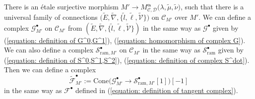\documentclass[pdftex]{sigma}
\numberwithin{equation}{section}
\newcommand{\balpha}{\boldsymbol \alpha}
\begin{document}
There is an \'etale surjective morphism
$M'\longrightarrow M^{\balpha}_{{\mathcal C},{\mathcal D}}\big(\lambda,\tilde{\mu},\tilde{\nu}\big)$,
such that there is a universal family of connections
$\big(\tilde{E},\tilde{\nabla},\{\tilde{l},\tilde{\ell},\tilde{\mathcal V}\}\big)$
on ${\mathcal C}_{M'}$ over $M'$.
We can define
a complex
${\mathcal G}^{\bullet}_{M'}$ on ${\mathcal C}_{M'}$
from
$(\tilde{E},\tilde{\nabla},\{\tilde{l},\tilde{\ell},\tilde{\mathcal V}\})$
in the same way as ${\mathcal G}^{\bullet}$
given by (\ref{equation: definition of G^0,G^1}), (\ref{equation: homomorphism of complex G}).
We can also define a complex
${\mathcal S}^{\bullet}_{\mathrm{ram},M'}$
on ${\mathcal C}_{M'}$
in the same way as
${\mathcal S}^{\bullet}_{\mathrm{ram}}$
given by (\ref{equation: definition of S^0,S^1,S^2}),
(\ref{equation: definition of complex S^dot}).
Then we can define a complex
\[
 \tilde{\mathcal F}^{\bullet}_{M'}
 :=
 \mathrm{Cone}\big( {\mathcal G}^{\bullet}_{M'} \rightarrow
 {\mathcal S}^{\bullet}_{\mathrm{ram},M'}[1] \big) [-1]
\]
in the same way as
${\mathcal F}^{\bullet}$ defined in (\ref{equation: definition of tangent complex}).
\end{document}
